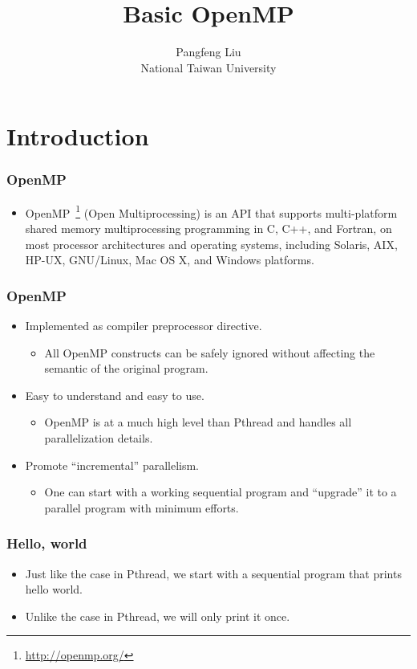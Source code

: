 \documentclass{beamer}
\begin{document}
\title{Basic OpenMP}

\author{Pangfeng Liu \\ National Taiwan University}

\begin{frame}
\titlepage
\end{frame}

\section{Introduction} 

\begin{frame}
\frametitle{OpenMP}
\begin{itemize}
\item OpenMP~\footnote{\url{http://openmp.org/}} (Open
  Multiprocessing) is an API that supports multi-platform shared
  memory multiprocessing programming in C, C++, and Fortran, on most
  processor architectures and operating systems, including Solaris,
  AIX, HP-UX, GNU/Linux, Mac OS X, and Windows platforms.
\end{itemize}
\end{frame}

\begin{frame}
\frametitle{OpenMP} 
\begin{itemize}
\item Implemented as compiler preprocessor directive.
\begin{itemize}
\item All OpenMP constructs can be safely ignored without affecting
  the semantic of the original program.
\end{itemize}
\item Easy to understand and easy to use.
\begin{itemize}
\item OpenMP is at a much high level than Pthread and handles all
  parallelization details.
\end{itemize}
\item Promote ``incremental'' parallelism.
\begin{itemize}
\item One can start with a working sequential program and ``upgrade''
  it to a parallel program with minimum efforts.
\end{itemize}
\end{itemize}
\end{frame}

\begin{frame}
\frametitle{Hello, world}
\begin{itemize}
\item Just like the case in Pthread, we start with a sequential program that prints hello world.
\item Unlike the case in Pthread, we will only print it once.
\end{itemize}
\end{frame}
\end{document}
